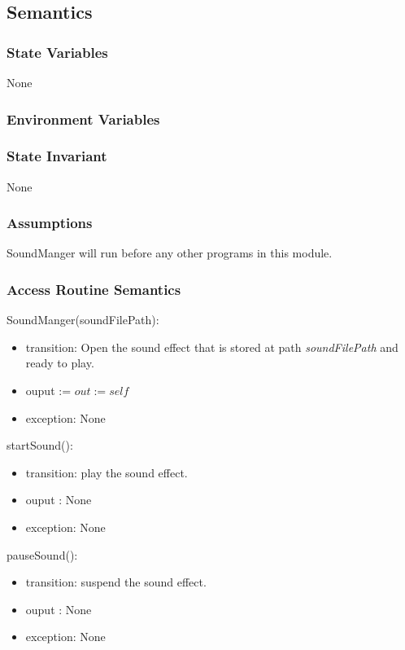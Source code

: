 \documentclass[12pt, titlepage]{article}
\begin{document}
\subsection* {Semantics}

\subsubsection* {State Variables}

None

\subsubsection* {Environment Variables}

\subsubsection* {State Invariant}

None

\subsubsection* {Assumptions}
SoundManger will run before any other programs in this module.

\subsubsection* {Access Routine Semantics}
SoundManger(soundFilePath):
\begin{itemize}
\item transition: Open the sound effect that is stored at path \textit{soundFilePath} and ready to play. 
\item ouput := $\mathit{out} := \mathit{self}$
\item exception: None
\end{itemize}

\noindent startSound():
\begin{itemize}
\item transition: play the sound effect. 
\item ouput : None
\item exception: None\\
\end{itemize}

\noindent pauseSound():
\begin{itemize}
\item transition: suspend the sound effect. 
\item ouput : None
\item exception: None\\
\end{itemize}
\end{document}
